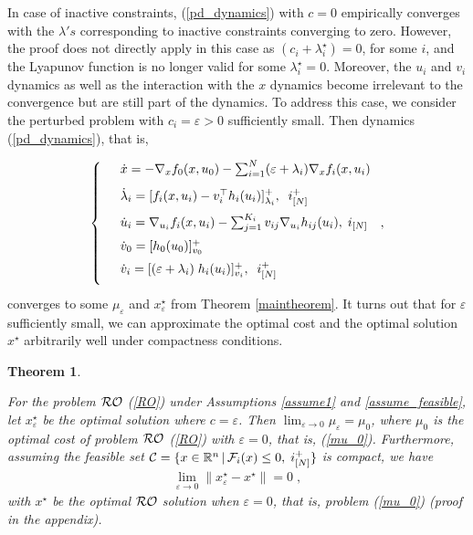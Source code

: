 \documentclass[journal,twoside,web]{ieeecolor}
\newtheorem{theorem}{Theorem}
\begin{document}

In case of inactive constraints, (\ref{pd_dynamics}) with $c=0$ empirically converges with the $\lambda's$ corresponding to inactive constraints converging to zero. However, the proof does not directly apply in this case as $(c_i+\lambda_i^\star)=0$, for some $i$, and the Lyapunov function is no longer valid for some $\lambda_i^\star=0$. Moreover, the $u_i$ and $v_i$ dynamics as well as the interaction with the $x$ dynamics become irrelevant to the convergence but are still part of the dynamics. 
To address this case, we consider the perturbed problem with $c_i=\varepsilon>0$ sufficiently small. Then dynamics (\ref{pd_dynamics}), that is,

\begin{align} \label{pd_dynamics_ep}
\left\{
\begin{array}{cl}
\vspace{3mm}
&\dot x=-\nabla_x f_0(x,u_0)- \sum_{i=1}^N(\varepsilon+\lambda_i) \nabla_x f_i(x,u_i)\\
\vspace{2mm}
&\dot \lambda_i=[f_i(x,u_i)-v_i^\top h_i(u_i)]_{\lambda_i}^+,\;\; i^+_{[N]}\\
\vspace{2mm}
&\dot u_i=\nabla_{u_i}f_i(x,u_i)-  \sum_{j=1}^{K_i} v_{ij} \nabla_{u_i} h_{ij}(u_i),\; i_{[N]}\\
\vspace{2mm}
&\dot{v}_0=[h_0(u_0)]_{v_0}^+\\
\vspace{2mm}
&\dot v_i=[(\varepsilon+\lambda_i) \; h_i(u_i)]_{v_i}^+,\;\;i^+_{[N]}
\end{array}\right.,
\end{align}
converges to some $\mu_{\varepsilon}$ and $x^\star_{\varepsilon}$ from Theorem \ref{maintheorem}. It turns out that for $\varepsilon$ sufficiently small, we can approximate the optimal cost and the optimal solution $x^\star$ arbitrarily well under compactness conditions.

\begin{theorem} \label{RO_ROperturbed} 

For the problem ${\cal RO}$ (\ref{RO}) under Assumptions \ref{assume1} and \ref{assume_feasible}, let $x^\star_\varepsilon$ be the optimal solution where $c=\varepsilon$. Then
$\displaystyle\lim_{\varepsilon \to 0}\mu_\varepsilon=\mu_0$, where $\mu_0$ is the optimal cost of problem ${\cal RO}$ (\ref{RO}) with $\varepsilon=0$, that is, (\ref{mu_0}). Furthermore, assuming the feasible set ${\cal C}=\{x\in \mathbb{R}^n\,|\,{\cal F}_i(x)\leq 0,\; i^+_{[N]}\}$ is compact, we have
\begin{align*}
\displaystyle\lim_{\varepsilon \to 0} \parallel x_\varepsilon^\star-x^\star \parallel=0\;,
\end{align*}
with $x^\star$ be the optimal ${\cal RO}$ solution when $\varepsilon=0$, that is, problem (\ref{mu_0}) (proof in the appendix).
\end{theorem}
\end{document}
